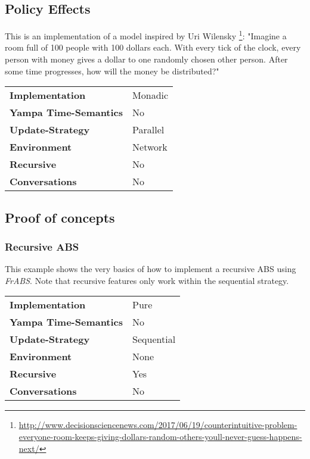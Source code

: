 \subsection{Policy Effects}
This is an implementation of a model inspired by Uri Wilensky \footnote{\url{http://www.decisionsciencenews.com/2017/06/19/counterintuitive-problem-everyone-room-keeps-giving-dollars-random-others-youll-never-guess-happens-next/}}: "Imagine a room full of 100 people with 100 dollars each. With every tick of the clock, every person with money gives a dollar to one randomly chosen other person. After some time progresses, how will the money be distributed?"

\begin{center}
\begin{tabular}{l || l }
\textbf{Implementation}			& Monadic \\
\textbf{Yampa Time-Semantics}	& No \\
\textbf{Update-Strategy}		& Parallel \\
\textbf{Environment}			& Network \\
\textbf{Recursive}				& No \\
\textbf{Conversations}			& No \\
\end{tabular}
\end{center}

\subsection{Proof of concepts}
\subsubsection{Recursive ABS} This example shows the very basics of how to implement a recursive ABS using \textit{FrABS}. Note that recursive features only work within the sequential strategy.

\begin{center}
\begin{tabular}{l || l }
\textbf{Implementation}			& Pure \\
\textbf{Yampa Time-Semantics}	& No \\
\textbf{Update-Strategy}		& Sequential \\
\textbf{Environment}			& None \\
\textbf{Recursive}				& Yes \\
\textbf{Conversations}			& No \\
\end{tabular}
\end{center}


